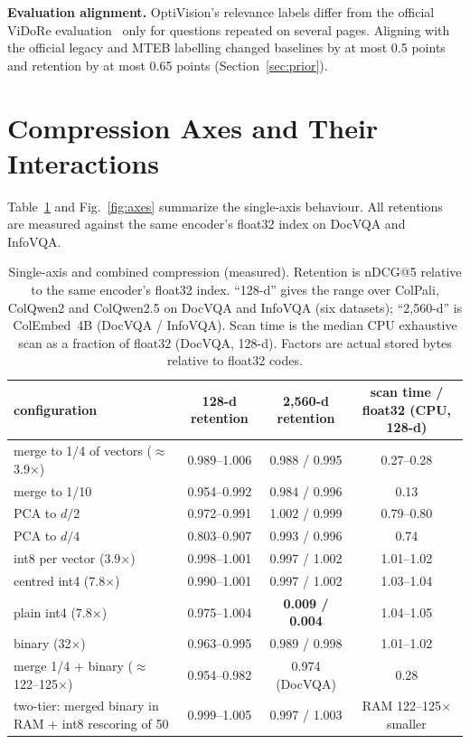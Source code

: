 \documentclass[conference]{IEEEtran}
\begin{document}
\textbf{Evaluation alignment.} OptiVision's relevance labels differ from the official
ViDoRe evaluation~\cite{mteb} only for questions repeated on several pages. Aligning
with the official legacy and MTEB labelling changed baselines by at most 0.5 points and
retention by at most 0.65 points (Section~\ref{sec:prior}).

\section{Compression Axes and Their Interactions}
\label{sec:axes}

Table~\ref{tab:axes} and Fig.~\ref{fig:axes} summarize the single-axis behaviour. All
retentions are measured against the same encoder's float32 index on DocVQA and InfoVQA.

\begin{table}[t]
\centering
\caption{Single-axis and combined compression (measured). Retention is nDCG@5 relative
to the same encoder's float32 index. ``128-d'' gives the range over ColPali, ColQwen2
and ColQwen2.5 on DocVQA and InfoVQA (six datasets); ``2,560-d'' is ColEmbed~4B
(DocVQA / InfoVQA). Scan time is the median CPU exhaustive scan as a fraction of float32
(DocVQA, 128-d). Factors are actual stored bytes relative to float32 codes.}
\label{tab:axes}
\begin{tabular}{lccc}
\toprule
configuration & 128-d retention & 2,560-d retention & scan time / float32 (CPU, 128-d) \\
\midrule
merge to 1/4 of vectors ($\approx$3.9$\times$) & 0.989--1.006 & 0.988 / 0.995 & 0.27--0.28 \\
merge to 1/10 & 0.954--0.992 & 0.984 / 0.996 & 0.13 \\
PCA to $d/2$ & 0.972--0.991 & 1.002 / 0.999 & 0.79--0.80 \\
PCA to $d/4$ & 0.803--0.907 & 0.993 / 0.996 & 0.74 \\
int8 per vector (3.9$\times$) & 0.998--1.001 & 0.997 / 1.002 & 1.01--1.02 \\
centred int4 (7.8$\times$) & 0.990--1.001 & 0.997 / 1.002 & 1.03--1.04 \\
plain int4 (7.8$\times$) & 0.975--1.004 & \textbf{0.009 / 0.004} & 1.04--1.05 \\
binary (32$\times$) & 0.963--0.995 & 0.989 / 0.998 & 1.01--1.02 \\
merge 1/4 + binary ($\approx$122--125$\times$) & 0.954--0.982 & 0.974 (DocVQA) & 0.28 \\
two-tier: merged binary in RAM + int8 rescoring of 50 & 0.999--1.005 & 0.997 / 1.003 & RAM 122--125$\times$ smaller \\
\bottomrule
\end{tabular}
\end{table}
\end{document}
